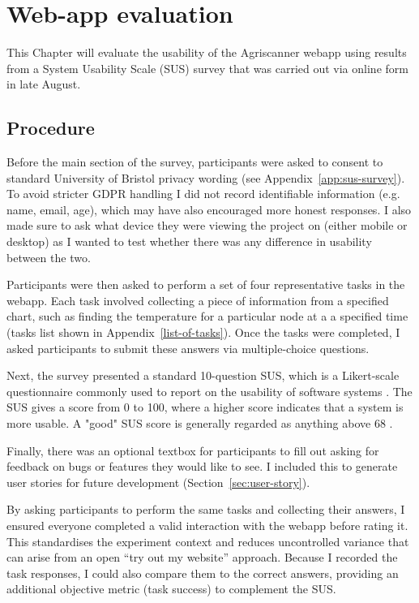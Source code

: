 \section{Web-app evaluation}

This Chapter will evaluate the usability of the Agriscanner webapp using results
from a System Usability Scale (SUS) survey that was carried out via online form
in late August.

\subsection{Procedure}

Before the main section of the survey, participants were asked to consent to
standard University of Bristol privacy wording (see
Appendix~\ref{app:sus-survey}). To avoid stricter GDPR handling I did not record
identifiable information (e.g. name, email, age), which may have also encouraged
more honest responses. I also made sure to ask what device they were viewing the
project on (either mobile or desktop) as I wanted to test whether there was any
difference in usability between the two.

Participants were then asked to perform a set of four representative tasks in
the webapp. Each task involved collecting a piece of information from a
specified chart, such as finding the temperature for a particular node at a a
specified time (tasks list shown in Appendix~\ref{list-of-tasks}). Once the
tasks were completed, I asked participants to submit these answers via
multiple-choice questions.

Next, the survey presented a standard 10-question SUS, which is a Likert-scale
questionnaire commonly used to report on the usability of software systems
\cite{brookeSUS1995}. The SUS gives a score from 0 to 100, where a higher score
indicates that a system is more usable. A "good" SUS score is generally regarded
as anything above 68 \cite{sauro2016quantifying}.

Finally, there was an optional textbox for participants to fill out asking for
feedback on bugs or features they would like to see. I included this to generate
user stories for future development (Section~\ref{sec:user-story}).

By asking participants to perform the same tasks and collecting their answers, I
ensured everyone completed a valid interaction with the webapp before rating it.
This standardises the experiment context and reduces uncontrolled variance that
can arise from an open “try out my website” approach. Because I recorded the
task responses, I could also compare them to the correct answers, providing an
additional objective metric (task success) to complement the SUS.

